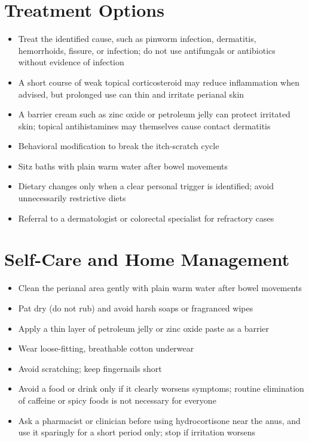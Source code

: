 \section*{Treatment Options}
\begin{itemize}
\item Treat the identified cause, such as pinworm infection, dermatitis, hemorrhoids, fissure, or infection; do not use antifungals or antibiotics without evidence of infection
\item A short course of weak topical corticosteroid may reduce inflammation when advised, but prolonged use can thin and irritate perianal skin
\item A barrier cream such as zinc oxide or petroleum jelly can protect irritated skin; topical antihistamines may themselves cause contact dermatitis
\item Behavioral modification to break the itch-scratch cycle
\item Sitz baths with plain warm water after bowel movements
\item Dietary changes only when a clear personal trigger is identified; avoid unnecessarily restrictive diets
\item Referral to a dermatologist or colorectal specialist for refractory cases
\end{itemize}

\section*{Self-Care and Home Management}
\begin{itemize}
\item Clean the perianal area gently with plain warm water after bowel movements
\item Pat dry (do not rub) and avoid harsh soaps or fragranced wipes
\item Apply a thin layer of petroleum jelly or zinc oxide paste as a barrier
\item Wear loose-fitting, breathable cotton underwear
\item Avoid scratching; keep fingernails short
\item Avoid a food or drink only if it clearly worsens symptoms; routine elimination of caffeine or spicy foods is not necessary for everyone
\item Ask a pharmacist or clinician before using hydrocortisone near the anus, and use it sparingly for a short period only; stop if irritation worsens
\end{itemize}

